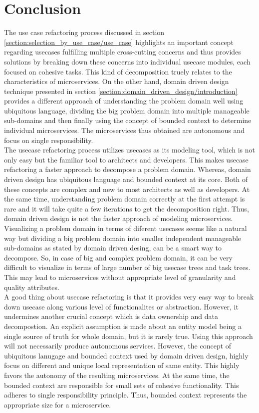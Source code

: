 \section{Conclusion}\label{section:modeling_microservices/conclusion}
The use case refactoring process discussed in section \ref{section:selection_by_use_case/use_case} highlights an important concept regarding usecases fulfilling multiple cross-cutting concerns and thus provides solutions by breaking down these concerns into individual usecase modules, each focused on cohesive tasks. This kind of decomposition truely relates to the characteristics of microservices. On the other hand, domain driven design technique presented in section \ref{section:domain_driven_design/introduction} provides a different approach of understanding the problem domain well using ubiquitous language, dividing the big problem domain into multiple manageable sub-domains and then finally using the concept of bounded context to determine individual microservices. The microservices thus obtained are autonomous and focus on single responsibility.\\
The usecase refactoring process utilizes usecases as its modeling tool, which is not only easy but the familiar tool to architects and developers. This makes usecase refactoring a faster approach to decompose a problem domain. Whereas, domain driven design has ubiquitous language and bounded context at its core. Both of these concepts are complex and new to most architects as well as developers. At the same time, understanding problem domain correctly at the first attempt is rare and it will take quite a few iterations to get the decomposition right. Thus, domain driven design is not the faster approach of modeling microservices.\\
Visualizing a problem domain in terms of diferent usecases seems like a natural way but dividing a big problem domain into smaller independent manageable sub-domains as stated by domain driven desing, can be a smart way to decompose. So, in case of big and complex problem domain, it can be very difficult to visualize in terms of large number of big usecase trees and task trees. This may lead to microservices without appropriate level of granularity and quality attributes.\\
A good thing about usecase refactoring is that it provides very easy way to break down usecase along various level of functionalites or abstraction. However, it undermines another crucial concept which is data ownership and data decompostion. An explicit assumption is made about an entity model being a single source of truth for whole domain, but it is rarely true. Using this approach will not necessarily produce autonomous services. However, the concept of ubiquitous lanugage and bounded context used by domain driven design, highly focus on different and unique local representation of same entity. This highly favors the autonomy of the resulting microservices. At the same time, the bounded context are responsible for small sets of cohesive functionality. This adheres to single responsibility principle. Thus, bounded context represents the appropriate size for a microservice.

